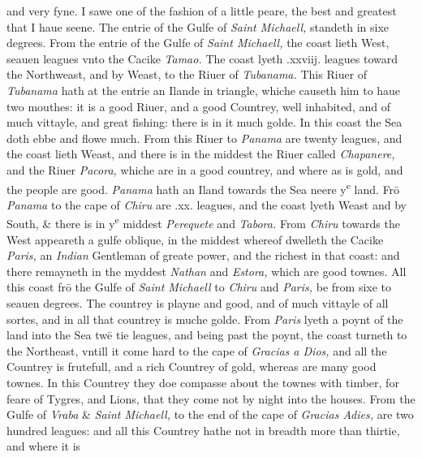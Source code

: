 \documentclass[11pt,twoside]{article}\makeatletter
\begin{document}
 and very fyne. I sawe one of the fashion of a little peare, the best and greatest that I haue seene. The entrie of the Gulfe of {\itshape Saint Michaell,} standeth in sixe degrees. From the entrie of the Gulfe of {\itshape Saint Michaell,} the coast lieth West, seauen leagues vnto the Cacike {\itshape Tamao.} The coast lyeth .xxviij. leagues to­ward the Northweast, and by Weast, to the Riuer of {\itshape Tuba­nama.} 
	\normalmarginpar
       This Riuer of {\itshape Tubanama} hath at the entrie an Ilande 
	\normalmarginpar
       in triangle, whiche causeth him to haue two mouthes: it is a good Riuer, and a good Countrey, well inhabited, and of much vittayle, and great fishing: there is in it much golde. In this coast the Sea doth ebbe and flowe much. From this Ri­uer to {\itshape Panama} are twenty leagues, and the coast lieth Weast, and there is in the middest the Riuer called {\itshape Chapanere,} and the 
	\normalmarginpar
       Riuer {\itshape Pacora,} whiche are in a good countrey, and where as is 
	\normalmarginpar
       gold, and the people are good. {\itshape Panama} hath an Iland towards the Sea neere y\textsuperscript{e} land. Frō {\itshape Panama} to the cape of {\itshape Chiru} are .xx. leagues, and the coast lyeth Weast and by South, \& there is 
	\normalmarginpar
       in y\textsuperscript{e} middest {\itshape Perequete} and {\itshape Tabora.} From {\itshape Chiru} towards the West appeareth a gulfe oblique, in the middest whereof dwel­leth the Cacike {\itshape Paris,} an {\itshape Indian} Gentleman of greate power, and the richest in that coast: and there remayneth in the myd­dest 
	\normalmarginpar
       {\itshape Nathan} and {\itshape Estora,} which are good townes. All this coast frō the Gulfe of {\itshape Saint Michaell} to {\itshape Chiru} and {\itshape Paris,} be from sixe to seauen degrees. The countrey is playne and good, and of much vittayle of all sortes, and in all that countrey is muche golde. From {\itshape Paris} lyeth a poynt of the land into the Sea twē ­tie leagues, and being past the poynt, the coast turneth to the Northeast, vntill it come hard to the cape of {\itshape Gracias a Dios,} and all the Countrey is frutefull, and a rich Countrey of gold, whereas are many good townes. In this Countrey they doe compasse about the townes with timber, for feare of Tygres, and Lions, that they come not by night into the houses. From the Gulfe of {\itshape Vraba} \& {\itshape Saint Michaell,} to the end of the cape of {\itshape Gracias Adies,} are two hundred leagues: and all this Coun­trey hathe not in breadth more than thirtie, and where it is %
\end{document}

